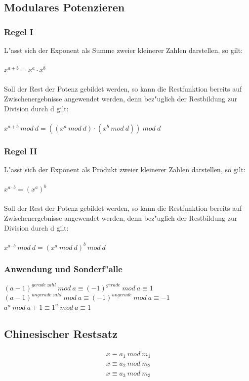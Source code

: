 \documentclass[10pt,a4paper,landscape]{article}
\begin{document}
\begin{multicols*}{3}
		\subsection{Modulares Potenzieren}
		\subsubsection{Regel I}L"asst sich der Exponent als Summe zweier kleinerer Zahlen darstellen, so gilt:\\\\
		$x^{a+b} = x^a \cdot x^b$\\\\
		Soll der Rest der Potenz gebildet werden, so kann die Restfunktion bereits auf Zwischenergebnisse angewendet werden, denn bez"uglich der Restbildung zur Division durch d gilt:
		\\\\
		$x^{a+b}~mod~d = ((x^a~mod~d) \cdot (x^b~mod~d))~mod~d $
		\subsubsection{Regel II}
		L"asst sich der Exponent als Produkt zweier kleinerer Zahlen darstellen, so gilt:\\\\
		$x^{a\cdot b} = (x^a)^b$\\\\
		Soll der Rest der Potenz gebildet werden, so kann die Restfunktion bereits auf Zwischenergebnisse angewendet werden, denn bez"uglich der Restbildung zur Division durch d gilt:\\\\
		$x^{a\cdot b}~mod~d = (x^a~mod~d)^b~mod~d$
		\subsubsection{Anwendung und Sonderf"alle}
		$(a-1)^{gerade~zahl}~mod~a \equiv (-1)^{gerade}~mod~a  \equiv 1$\\
		$(a-1)^{ungerade~zahl}~mod~a \equiv (-1)^{ungerade}~mod~a  \equiv -1$\\
		$a^{n}~mod~a+1 \equiv 1^n~mod~a \equiv 1$\\
		
		\subsection{Chinesischer Restsatz}
		\begin{align*}
		x \equiv a_1~mod~m_1 \\
		x \equiv a_2~mod~m_2 \\
		x \equiv a_3~mod~m_3 
		\end{align*}
		

\end{multicols*}
\end{document}
